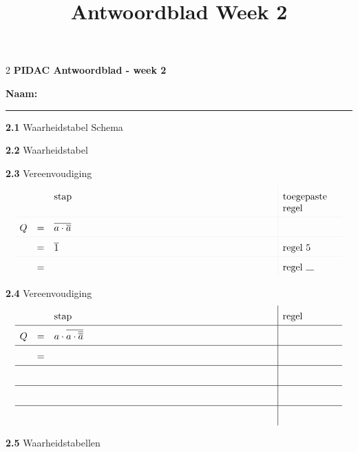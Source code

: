 \documentclass[a4paper,12pt]{paper}
\title{Antwoordblad Week 2}
\date{}
\newcommand{\hairlinew}{0.01mm}
\begin{document}
\begin{multicols}{2}
\textbf{\large PIDAC Antwoordblad - week 2}

\vspace{0.8cm}
\textbf{Naam:} \rule{12cm}{0.4pt}


\begin{tcolorbox}
\textbf{2.1} Waarheidstabel \hspace{4cm} Schema
\vspace{5cm}
\end{tcolorbox}

\begin{tcolorbox}
\textbf{2.2} Waarheidstabel
\vspace{4.5cm}
\end{tcolorbox}


\begin{tcolorbox}
\textbf{2.3} Vereenvoudiging
\[
{\renewcommand{\arraystretch}{1.7}
\setlength{\arrayrulewidth}{\hairlinew}
\begin{array}{rcl|p{2cm}}
&&{\text{stap}} & \text{toegepaste} \text{regel} \\\hline
Q & = & \overline{a \cdot \overline{a}}  \\\hline
    & = & \overline{1}               & \text{regel 5}\\\hline
    & = & \hspace{8cm}                   & \text{regel \rule{0.3cm}{0.4pt}}
\end{array}}
\]
\end{tcolorbox}
\columnbreak

\begin{tcolorbox}
\textbf{2.4} Vereenvoudiging
\[
{\renewcommand{\arraystretch}{1.7}
\begin{array}{rcl|p{2cm}}
&&{\text{stap}} & \text{regel} \\\hline
Q & = & a\cdot \overline{a \cdot \overline{\overline{a}}}  \\\hline
    & = &   \hspace{8cm}              & \\\hline
    &  &   & \\\hline    
    &  &   & \\\hline
                        &  &   & 
\end{array}}
\]
\end{tcolorbox}

\begin{tcolorbox}
\textbf{2.5} Waarheidstabellen
\vspace{11.5cm}
\end{tcolorbox}


\end{multicols}
\end{document}
